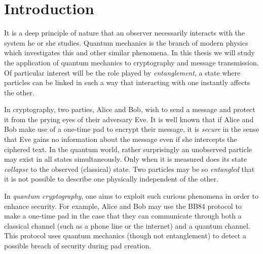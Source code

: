 
\chapter{Introduction} %

\label{Chapter1-introduction} %


\newcommand{\keyword}[1]{\textbf{#1}}
\newcommand{\tabhead}[1]{\textbf{#1}}
\newcommand{\code}[1]{\texttt{#1}}
\newcommand{\file}[1]{\texttt{\bfseries#1}}
\newcommand{\option}[1]{\texttt{\itshape#1}}

It is a deep principle of nature that an observer necessarily interacts with the system he or she studies. Quantum mechanics is the branch of modern physics which investigates this and other similar phenomena. In this thesis we will study the application of quantum mechanics to cryptography and message transmission. Of particular interest will be the role played by {\emph{entanglement}}, a state where particles can be linked in such a way that interacting with one instantly affects the other. 

In cryptography, two parties, Alice and Bob, wish to send a message and protect it from the prying eyes of their adversary Eve. It is well known that if Alice and Bob make use of a one-time pad to encrypt their message, it is \emph{secure} in the sense that Eve gains no information about the message even if she intercepts the ciphered text. 
In the quantum world, rather surprisingly an unobserved particle may exist in all states simultaneously. Only when it is measured does its state {\emph{collapse}} to the observed (classical) state.  Two particles may be so {\emph{entangled}} that it is not possible to describe one physically independent of the other.  


In {\emph{quantum cryptography}}, one aims to exploit such curious phenomena in order to enhance security. For example, Alice and Bob may use the BB84 protocol to make a one-time pad in the case that they can communicate through both a classical channel (such as a phone line or the internet) and a quantum channel. This protocol uses quantum mechanics (though not entanglement) to detect a possible breach of security during pad creation.  

